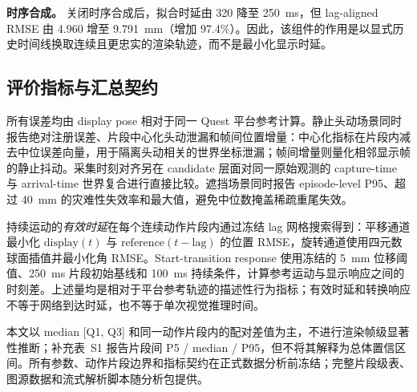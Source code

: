 \textbf{时序合成。}
关闭时序合成后，拟合时延由 320 降至 250~ms，但 lag-aligned RMSE 由 4.960 增至 9.791~mm（增加 97.4\%）。因此，该组件的作用是以显式历史时间线换取连续且更忠实的渲染轨迹，而不是最小化显示时延。
\FloatBarrier

\subsection{评价指标与汇总契约}

所有误差均由 display pose 相对于同一 Quest 平台参考计算。静止头动场景同时报告绝对注册误差、片段中心化头动泄漏和帧间位置增量：中心化指标在片段内减去中位误差向量，用于隔离头动相关的世界坐标泄漏；帧间增量则量化相邻显示帧的静止抖动。采集时刻对齐另在 candidate 层面对同一原始观测的 capture-time 与 arrival-time 世界复合进行直接比较。遮挡场景同时报告 episode-level P95、超过 40~mm 的灾难性失效率和最大值，避免中位数掩盖稀疏重尾失效。

持续运动的\emph{有效时延}在每个连续动作片段内通过冻结 lag 网格搜索得到：平移通道最小化 $\mathrm{display}(t)$ 与 $\mathrm{reference}(t-\mathrm{lag})$ 的位置 RMSE，旋转通道使用四元数球面插值并最小化角 RMSE。Start-transition response 使用冻结的 5~mm 位移阈值、250~ms 片段初始基线和 100~ms 持续条件，计算参考运动与显示响应之间的时刻差。上述量均是相对于平台参考轨迹的描述性行为指标；有效时延和转换响应不等于网络到达时延，也不等于单次视觉推理时间。

本文以 median [Q1, Q3] 和同一动作片段内的配对差值为主，不进行渲染帧级显著性推断；补充表~S1 报告片段间 P5 / median / P95，但不将其解释为总体置信区间。所有参数、动作片段边界和指标契约在正式数据分析前冻结；完整片段级表、图源数据和流式解析脚本随分析包提供。

